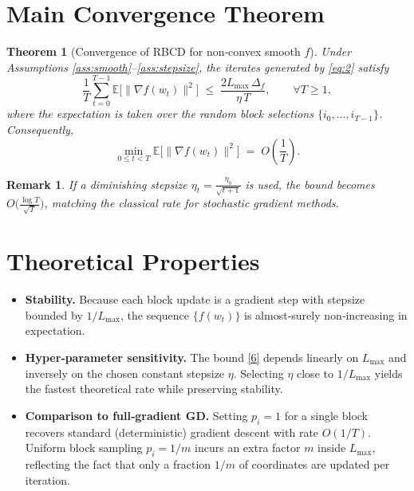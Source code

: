\documentclass{article}
\newtheorem{theorem}{Theorem}
\newtheorem{remark}{Remark}
\begin{document}
\section*{Main Convergence Theorem}
\begin{theorem}[Convergence of RBCD for non‑convex smooth $f$]\label{thm:main}
Under Assumptions \ref{ass:smooth}–\ref{ass:stepsize}, the iterates generated by
\eqref{eq:2} satisfy
\[
\frac{1}{T}\sum_{t=0}^{T-1}\mathbb{E}\bigl[\|\nabla f(w_t)\|^{2}\bigr]
\;\le\;
\frac{2L_{\max}\,\Delta_f}{\eta\,T},
\qquad\forall T\ge 1,
\tag{6}
\]
where the expectation is taken over the random block selections
$\{i_0,\dots ,i_{T-1}\}$.
Consequently,
\[
\min_{0\le t<T}\mathbb{E}\bigl[\|\nabla f(w_t)\|^{2}\bigr]
\;=\;O\!\left(\frac{1}{T}\right).
\]
\end{theorem}

\begin{remark}
If a diminishing stepsize $\eta_t=\frac{\eta_0}{\sqrt{t+1}}$ is used,
the bound becomes $O\!\bigl(\frac{\log T}{\sqrt{T}}\bigr)$, matching the classical
rate for stochastic gradient methods.
\end{remark}

\section*{Theoretical Properties}
\begin{itemize}
\item \textbf{Stability.} Because each block update is a gradient step with stepsize bounded by $1/L_{\max}$, the sequence $\{f(w_t)\}$ is almost‑surely non‑increasing in expectation.
\item \textbf{Hyper‑parameter sensitivity.} The bound \eqref{6} depends linearly on $L_{\max}$ and inversely on the chosen constant stepsize $\eta$. Selecting $\eta$ close to $1/L_{\max}$ yields the fastest theoretical rate while preserving stability.
\item \textbf{Comparison to full‑gradient GD.} Setting $p_i=1$ for a single block recovers standard (deterministic) gradient descent with rate $O(1/T)$. Uniform block sampling $p_i=1/m$ incurs an extra factor $m$ inside $L_{\max}$, reflecting the fact that only a fraction $1/m$ of coordinates are updated per iteration.
\end{itemize}
\end{document}
